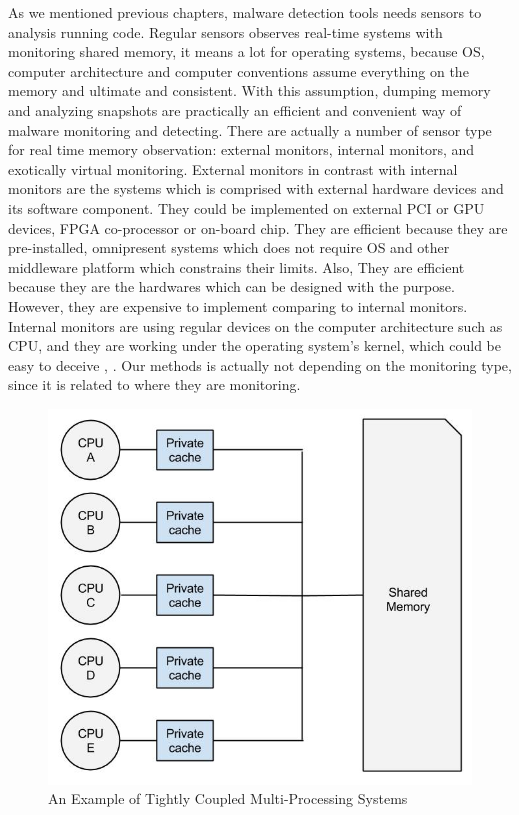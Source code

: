 As we mentioned previous chapters, malware detection tools needs sensors to analysis running code. Regular sensors observes real-time systems with monitoring shared memory, it means a lot for operating systems, because OS, computer architecture and computer conventions assume everything on the memory and ultimate and consistent. With this assumption, dumping memory and analyzing snapshots are practically an efficient and convenient way of malware monitoring and detecting. There are actually a number of sensor type for real time memory observation: external monitors, internal monitors, and exotically virtual monitoring. External monitors in contrast with internal monitors are the systems which is comprised with external hardware devices and its software component. They could be implemented on external PCI or GPU devices, FPGA co-processor or on-board chip\cite{Christos2013}. They are efficient because they are pre-installed, omnipresent systems which does not require OS and other middleware platform which constrains their limits. Also, They are efficient because they are the hardwares which can be designed with the purpose. However, they are expensive to implement comparing to internal monitors. Internal monitors are using regular devices on the computer architecture such as CPU, and they are working under the operating system's kernel, which could be easy to deceive \cite{Adnan2011}, \cite{rutkowska2006rootkits}. Our methods is actually not depending on the monitoring type, since it is related to where they are monitoring.
    \begin{figure}[h!]
        \centering
        \includegraphics[width=1\textwidth]{img/tightly_coupled_multiprocessing_systems.jpg}
        \caption{An Example of Tightly Coupled Multi-Processing Systems}
        \label{fig:tightlycoupled}
    \end{figure}
